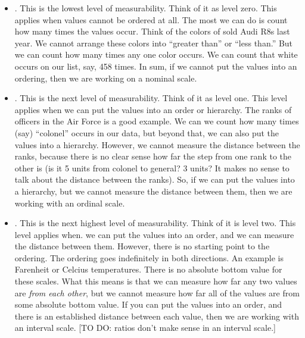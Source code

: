 \documentclass[../../../main.tex]{subfiles}
\begin{document}
\begin{itemize}

  \item {}. This is the lowest level of measurability. Think of it as level zero. This applies when values cannot be ordered at all. The most we can do is count how many times the values occur. Think of the colors of sold Audi R8s last year. We cannot arrange these colors into ``greater than'' or ``less than.'' But we can count how many times any one color occurs. We can count that white occurs on our list, say, 458 times. In sum, if we cannot put the values into an ordering, then we are working on a nominal scale.
  
  \item {}. This is the next level of measurability. Think of it as level one. This level applies when we can put the values into an order or hierarchy. The ranks of officers in the Air Force is a good example. We can we count how many times (say) ``colonel'' occurs in our data, but beyond that, we can also put the values into a hierarchy. However, we cannot measure the distance between the ranks, because there is no clear sense how far the step from one rank to the other is (is it 5 units from colonel to general? 3 units? It makes no sense to talk about the distance between the ranks). So, if we can put the values into a hierarchy, but we cannot measure the distance between them, then we are working with an ordinal scale.
  
  \item {}. This is the next highest level of measurability. Think of it is level two. This level applies when. we can put the values into an order, and we can measure the distance between them. However, there is no starting point to the ordering. The ordering goes indefinitely in both directions. An example is Farenheit or Celcius temperatures. There is no absolute bottom value for these scales. What this means is that we can measure how far any two values are \emph{from each other}, but we cannot measure how far all of the values are from some absolute bottom value. If you can put the values into an order, and there is an established distance between each value, then we are working with an interval scale. [TO DO: ratios don't make sense in an interval scale.]
  

\end{itemize}
\end{document}
